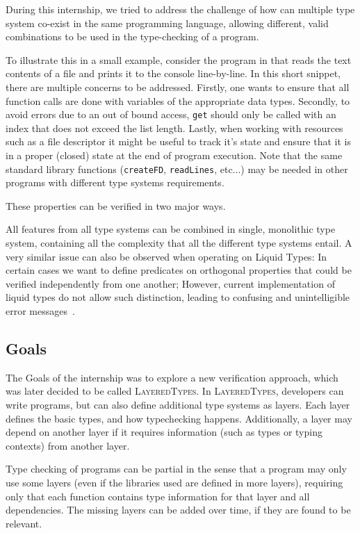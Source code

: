 \documentclass{easychair}
\newcommand{\LayeredTypes}{\textsc{LayeredTypes}}
\begin{document}
During this internship, we tried to address the challenge of how can multiple type system co-exist in the same programming language, allowing different, valid combinations to be used in the type-checking of a program.
 
 To illustrate this in a small example, consider the program in  that reads the text contents of a file and prints it to the console line-by-line. In this short snippet, there are multiple concerns to be addressed. Firstly, one wants to ensure that all function calls are done with variables of the appropriate data types. Secondly, to avoid errors due to an out of bound access, \texttt{get} should only be called with an index that does not exceed the list length. Lastly, when working with resources such as a file descriptor it might be useful to track it's state and ensure that it is in a proper (closed) state at the end of program execution. Note that the same standard library functions (\lstinline|createFD|, \lstinline|readLines|, etc...) may be needed in other programs with different type systems requirements.

These properties can be verified in two major ways. 

All features from all type systems can be combined in single, monolithic type system, containing all the complexity that all the different type systems entail. A very similar issue can also be observed when operating on Liquid Types: In certain cases we want to define predicates on orthogonal properties that could be verified independently from one another; However, current implementation of liquid types do not allow such distinction, leading to confusing and unintelligible error messages~\cite{wits-error-messages}. 

\subsection{Goals}
\label{sec:proposed-approach}
The Goals of the internship was to explore a new verification approach, which was later decided to be called \LayeredTypes. In \LayeredTypes, developers can write programs, but can also define additional type systems as layers. Each layer defines the basic types, and how typechecking happens. Additionally, a layer may depend on another layer if it requires information (such as types or typing contexts) from another layer.

Type checking of programs can be partial in the sense that a program may only use some layers (even if the libraries used are defined in more layers), requiring only that each function contains type information for that layer and all dependencies. The missing layers can be added over time, if they are found to be relevant.
\end{document}
